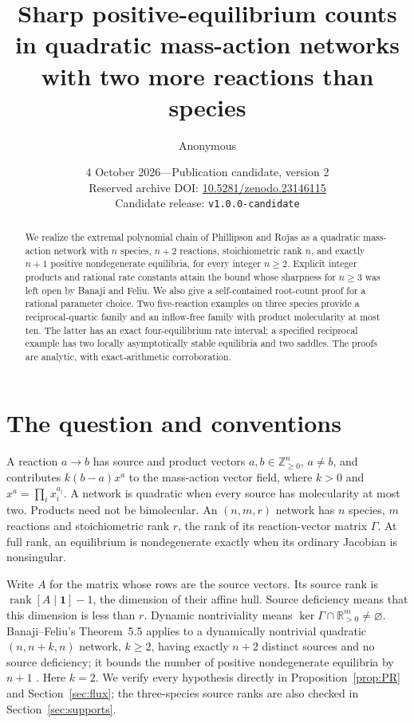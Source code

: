 \documentclass[11pt]{article}
\title{Sharp positive-equilibrium counts in quadratic mass-action networks with two more reactions than species}
\author{Anonymous}
\date{4 October 2026\quad---\quad Publication candidate, version 2\\[3pt]
\small Reserved archive DOI: \href{https://doi.org/10.5281/zenodo.23146115}{10.5281/zenodo.23146115}\\
\small Candidate release: \texttt{v1.0.0-candidate}}
\newcommand{\R}{\mathbb R}
\begin{document}
\maketitle
\begin{abstract}
We realize the extremal polynomial chain of Phillipson and Rojas as a quadratic mass-action network with $n$ species, $n+2$ reactions, stoichiometric rank $n$, and exactly $n+1$ positive nondegenerate equilibria, for every integer $n\geq2$. Explicit integer products and rational rate constants attain the bound whose sharpness for $n\geq3$ was left open by Banaji and Feliu. We also give a self-contained root-count proof for a rational parameter choice. Two five-reaction examples on three species provide a reciprocal-quartic family and an inflow-free family with product molecularity at most ten. The latter has an exact four-equilibrium rate interval; a specified reciprocal example has two locally asymptotically stable equilibria and two saddles. The proofs are analytic, with exact-arithmetic corroboration.
\end{abstract}

\section{The question and conventions}
A reaction $a\to b$ has source and product vectors $a,b\in\mathbb Z_{\geq0}^n$, $a\ne b$, and contributes $k(b-a)x^a$ to the mass-action vector field, where $k>0$ and $x^a=\prod_i x_i^{a_i}$. A network is quadratic when every source has molecularity at most two. Products need not be bimolecular. An $(n,m,r)$ network has $n$ species, $m$ reactions and stoichiometric rank $r$, the rank of its reaction-vector matrix $\Gamma$. At full rank, an equilibrium is nondegenerate exactly when its ordinary Jacobian is nonsingular.

Write $A$ for the matrix whose rows are the source vectors. Its source rank is $\operatorname{rank}[A\mid\mathbf1]-1$, the dimension of their affine hull. Source deficiency means that this dimension is less than $r$. Dynamic nontriviality means $\ker\Gamma\cap\R_{>0}^m\ne\varnothing$. Banaji--Feliu's Theorem~5.5 applies to a dynamically nontrivial quadratic $(n,n+k,n)$ network, $k\geq2$, having exactly $n+2$ distinct sources and no source deficiency; it bounds the number of positive nondegenerate equilibria by $n+1$ \cite{BF}. Here $k=2$. We verify every hypothesis directly in Proposition~\ref{prop:PR} and Section~\ref{sec:flux}; the three-species source ranks are also checked in Section~\ref{sec:supports}.
\end{document}
